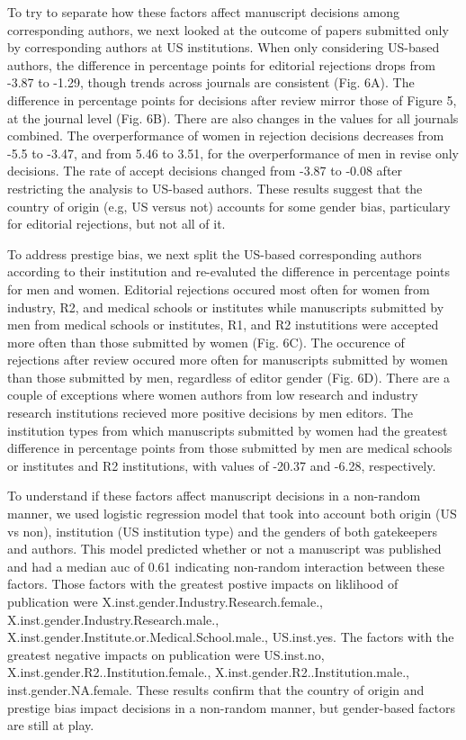 \documentclass[11pt,]{article}
\begin{document}
To try to separate how these factors affect manuscript decisions among
corresponding authors, we next looked at the outcome of papers submitted
only by corresponding authors at US institutions. When only considering
US-based authors, the difference in percentage points for editorial
rejections drops from -3.87 to -1.29, though trends across journals are
consistent (Fig. 6A). The difference in percentage points for decisions
after review mirror those of Figure 5, at the journal level (Fig. 6B).
There are also changes in the values for all journals combined. The
overperformance of women in rejection decisions decreases from -5.5 to
-3.47, and from 5.46 to 3.51, for the overperformance of men in revise
only decisions. The rate of accept decisions changed from -3.87 to -0.08
after restricting the analysis to US-based authors. These results
suggest that the country of origin (e.g, US versus not) accounts for
some gender bias, particulary for editorial rejections, but not all of
it.

To address prestige bias, we next split the US-based corresponding
authors according to their institution and re-evaluted the difference in
percentage points for men and women. Editorial rejections occured most
often for women from industry, R2, and medical schools or institutes
while manuscripts submitted by men from medical schools or institutes,
R1, and R2 instutitions were accepted more often than those submitted by
women (Fig. 6C). The occurence of rejections after review occured more
often for manuscripts submitted by women than those submitted by men,
regardless of editor gender (Fig. 6D). There are a couple of exceptions
where women authors from low research and industry research institutions
recieved more positive decisions by men editors. The institution types
from which manuscripts submitted by women had the greatest difference in
percentage points from those submitted by men are medical schools or
institutes and R2 institutions, with values of -20.37 and -6.28,
respectively.

To understand if these factors affect manuscript decisions in a
non-random manner, we used logistic regression model that took into
account both origin (US vs non), institution (US institution type) and
the genders of both gatekeepers and authors. This model predicted
whether or not a manuscript was published and had a median auc of 0.61
indicating non-random interaction between these factors. Those factors
with the greatest postive impacts on liklihood of publication were
X.inst.gender.Industry.Research.female.,
X.inst.gender.Industry.Research.male.,
X.inst.gender.Institute.or.Medical.School.male., US.inst.yes. The
factors with the greatest negative impacts on publication were
US.inst.no, X.inst.gender.R2..Institution.female.,
X.inst.gender.R2..Institution.male., inst.gender.NA.female. These
results confirm that the country of origin and prestige bias impact
decisions in a non-random manner, but gender-based factors are still at
play.
\end{document}

